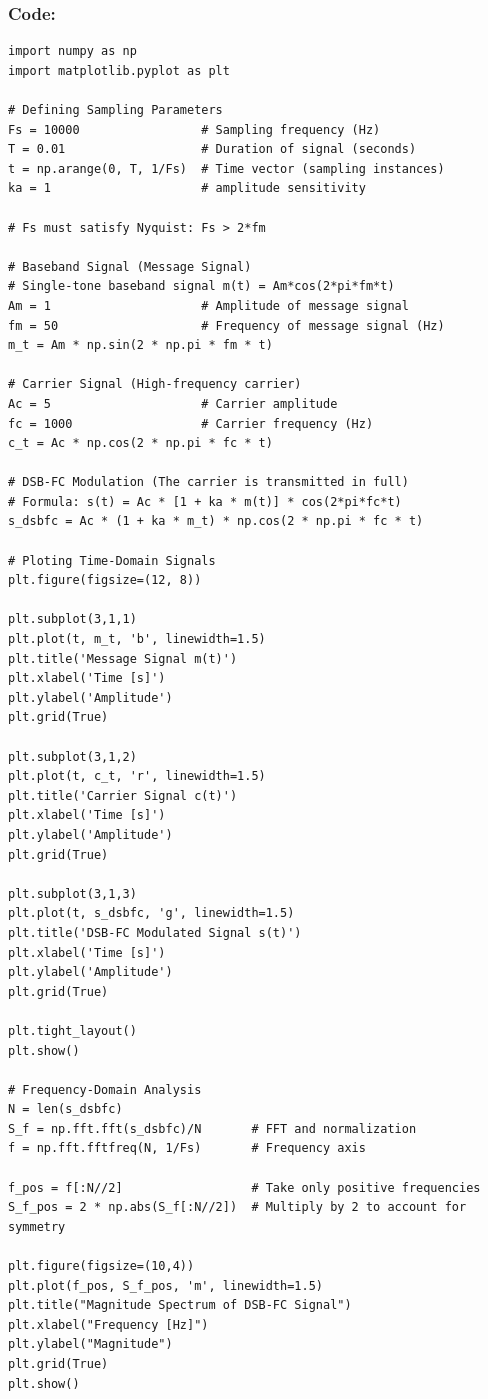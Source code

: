 \newpage
\subsubsection*{Code:}

\begin{verbatim}
import numpy as np
import matplotlib.pyplot as plt

# Defining Sampling Parameters
Fs = 10000                 # Sampling frequency (Hz)
T = 0.01                   # Duration of signal (seconds)
t = np.arange(0, T, 1/Fs)  # Time vector (sampling instances)
ka = 1                     # amplitude sensitivity

# Fs must satisfy Nyquist: Fs > 2*fm

# Baseband Signal (Message Signal)
# Single-tone baseband signal m(t) = Am*cos(2*pi*fm*t)
Am = 1                     # Amplitude of message signal
fm = 50                    # Frequency of message signal (Hz)
m_t = Am * np.sin(2 * np.pi * fm * t)

# Carrier Signal (High-frequency carrier)
Ac = 5                     # Carrier amplitude
fc = 1000                  # Carrier frequency (Hz)
c_t = Ac * np.cos(2 * np.pi * fc * t)

# DSB-FC Modulation (The carrier is transmitted in full)
# Formula: s(t) = Ac * [1 + ka * m(t)] * cos(2*pi*fc*t)
s_dsbfc = Ac * (1 + ka * m_t) * np.cos(2 * np.pi * fc * t)

# Ploting Time-Domain Signals
plt.figure(figsize=(12, 8))

plt.subplot(3,1,1)
plt.plot(t, m_t, 'b', linewidth=1.5)
plt.title('Message Signal m(t)')
plt.xlabel('Time [s]')
plt.ylabel('Amplitude')
plt.grid(True)

plt.subplot(3,1,2)
plt.plot(t, c_t, 'r', linewidth=1.5)
plt.title('Carrier Signal c(t)')
plt.xlabel('Time [s]')
plt.ylabel('Amplitude')
plt.grid(True)

plt.subplot(3,1,3)
plt.plot(t, s_dsbfc, 'g', linewidth=1.5)
plt.title('DSB-FC Modulated Signal s(t)')
plt.xlabel('Time [s]')
plt.ylabel('Amplitude')
plt.grid(True)

plt.tight_layout()
plt.show()

# Frequency-Domain Analysis
N = len(s_dsbfc)
S_f = np.fft.fft(s_dsbfc)/N       # FFT and normalization
f = np.fft.fftfreq(N, 1/Fs)       # Frequency axis 

f_pos = f[:N//2]                  # Take only positive frequencies
S_f_pos = 2 * np.abs(S_f[:N//2])  # Multiply by 2 to account for symmetry

plt.figure(figsize=(10,4))
plt.plot(f_pos, S_f_pos, 'm', linewidth=1.5)
plt.title("Magnitude Spectrum of DSB-FC Signal")
plt.xlabel("Frequency [Hz]")
plt.ylabel("Magnitude")
plt.grid(True)
plt.show()
\end{verbatim}

